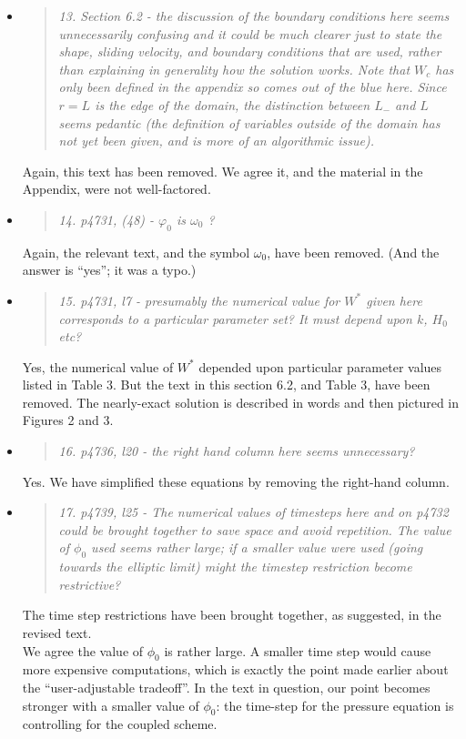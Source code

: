 \documentclass[11pt,reqno]{amsart}
\newcommand{\reply}[2]{
\medskip\medskip
\item  \begin{quote}
\emph{#1}
\end{quote}

\medskip
\noindent #2}
\begin{document}
\begin{itemize}
\reply{13. Section 6.2 - the discussion of the boundary conditions here seems unnecessarily confusing and it could be much clearer just to state the shape, sliding velocity, and boundary conditions that are used, rather than explaining in generality how the solution works. Note that $W_c$ has only been defined in the appendix so comes out of the blue here. Since $r = L$ is the edge of the domain, the distinction between $L_-$ and $L$ seems pedantic (the definition of variables outside of the domain has not yet been given, and is more of an algorithmic issue).}
{Again, this text has been removed.  We agree it, and the material in the Appendix, were not well-factored.}

\reply{14. p4731, (48) - $\varphi_0$ is $\omega_0$ ?}
{Again, the relevant text, and the symbol $\omega_0$, have been removed.  (And the answer is ``yes''; it was a typo.)}

\reply{15. p4731, l7 - presumably the numerical value for $W^*$ given here corresponds to a particular parameter set? It must depend upon $k$, $H_0$ etc?}
{Yes, the numerical value of $W^*$ depended upon particular parameter values listed in Table 3.  But the text in this section 6.2, and Table 3, have been removed.  The nearly-exact solution is described in words and then pictured in Figures 2 and 3.}

\reply{16. p4736, l20 - the right hand column here seems unnecessary?}
{Yes.  We have simplified these equations by removing the right-hand column.}

\reply{17. p4739, l25 - The numerical values of timesteps here and on p4732 could be brought together to save space and avoid repetition. The value of $\phi_0$ used seems rather large; if a smaller value were used (going towards the elliptic limit) might the timestep restriction become restrictive?}
{The time step restrictions have been brought together, as suggested, in the revised text. \\
\indent  We agree the value of $\phi_0$ is rather large.  A smaller time step would cause more expensive computations, which is exactly the point made earlier about the ``user-adjustable tradeoff''.  In the text in question, our point becomes stronger with a smaller value of $\phi_0$: the time-step for the pressure equation is controlling for the coupled scheme.}


\end{itemize}
\end{document}

